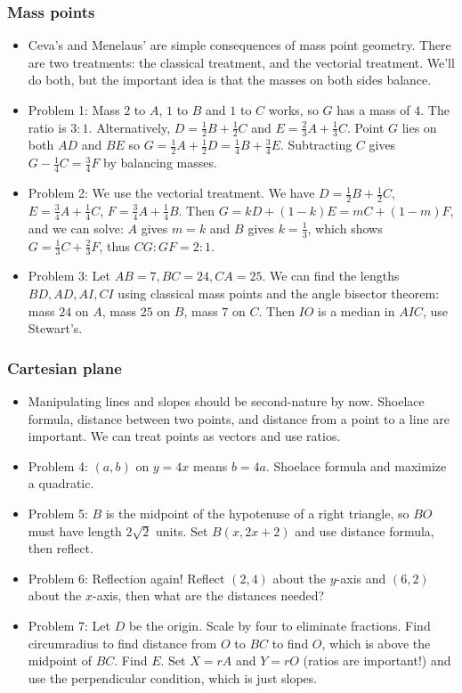 \documentclass[10pt,paper=letter]{scrartcl}
\begin{document}
\subsubsection*{Mass points}

\begin{itemize}
  \item Ceva's and Menelaus' are simple consequences of mass point geometry. There are two treatments: the classical treatment, and the vectorial treatment. We'll do both, but the important idea is that the masses on both sides balance. 
  \item Problem 1: Mass $2$ to $A$, $1$ to $B$ and $1$ to $C$ works, so $G$ has a mass of $4$. The ratio is $3 : 1$. Alternatively, $D = \frac12B + \frac12C$ and $E = \frac23A + \frac13C$. Point $G$ lies on both $AD$ and $BE$ so $G = \frac12A + \frac12D = \frac14B + \frac34E$. Subtracting $C$ gives $G-\frac14C = \frac34F$ by balancing masses.
  \item Problem 2: We use the vectorial treatment. We have $D = \frac12B + \frac12C$, $E = \frac34A + \frac14C$, $F = \frac34A + \frac14B$. Then $G = kD + (1-k)E = mC + (1-m)F$, and we can solve: $A$ gives $m=k$ and $B$ gives $k = \frac13$, which shows $G = \frac13C + \frac23F$, thus $CG : GF = 2 : 1$.
  \item Problem 3: Let $AB = 7, BC = 24, CA = 25$. We can find the lengths $BD, AD, AI, CI$ using classical mass points and the angle bisector theorem: mass $24$ on $A$, mass $25$ on $B$, mass $7$ on $C$. Then $IO$ is a median in $AIC$, use Stewart's.
\end{itemize}

\newpage

\subsubsection*{Cartesian plane}

\begin{itemize}
  \item Manipulating lines and slopes should be second-nature by now. Shoelace formula, distance between two points, and distance from a point to a line are important. We can treat points as vectors and use ratios.
  \item Problem 4: $(a, b)$ on $y = 4x$ means $b = 4a$. Shoelace formula and maximize a quadratic.
  \item Problem 5: $B$ is the midpoint of the hypotenuse of a right triangle, so $BO$ must have length $2\sqrt2$ units. Set $B(x, 2x+2)$ and use distance formula, then reflect.
  \item Problem 6: Reflection again! Reflect $(2, 4)$ about the $y$-axis and $(6, 2)$ about the $x$-axis, then what are the distances needed?
  \item Problem 7: Let $D$ be the origin. Scale by four to eliminate fractions. Find circumradius to find distance from $O$ to $BC$ to find $O$, which is above the midpoint of $BC$. Find $E$. Set $X = rA$ and $Y = rO$ (ratios are important!) and use the perpendicular condition, which is just slopes.
\end{itemize}
\end{document}
